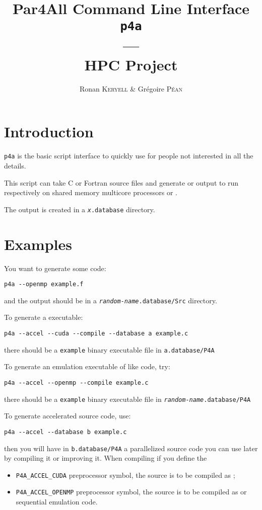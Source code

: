 \documentclass[a4paper]{article}
\begin{document}
\title{Par4All Command Line Interface\\
  \texttt{p4a}\\
  ---\\
  HPC Project}

\author{Ronan \textsc{Keryell} \& Grégoire \textsc{Péan}}

\maketitle

\tableofcontents{}

\section{Introduction}
\label{sec:introduction}

\texttt{p4a} is the basic script interface to quickly use \Apfa for people
not interested in all the \Apfa details.

This script can take C or Fortran source files and generate \Aopenmp or
\Acuda output to run respectively on shared memory multicore processors or
\Agpu.

The output is created in a \texttt{\emph{x}.database} directory.


\section{Examples}
\label{sec:examples}

You want to generate some \Aopenmp code:
\begin{verbatim}
p4a --openmp example.f
\end{verbatim}
and the output should be in a \texttt{\emph{random-name}.database/Src}
directory.

To generate a \Acuda executable:
\begin{verbatim}
p4a --accel --cuda --compile --database a example.c
\end{verbatim}
there should be a \texttt{example} binary executable file in
\texttt{a.database/P4A}

To generate an \Aopenmp emulation executable of \Agpu like code, try:
\begin{verbatim}
p4a --accel --openmp --compile example.c
\end{verbatim}
there should be a \texttt{example} binary executable file in
\texttt{\emph{random-name}.database/P4A}

To generate accelerated source code, use:
\begin{verbatim}
p4a --accel --database b example.c
\end{verbatim}
then you will have in \texttt{b.database/P4A} a parallelized source code
you can use later by compiling it or improving it. When compiling if you
define the
\begin{itemize}
\item \verb|P4A_ACCEL_CUDA| preprocessor symbol, the source is to be
  compiled as \Acuda;
\item \verb|P4A_ACCEL_OPENMP| preprocessor symbol, the source is to be
  compiled as \Aopenmp or sequential emulation code.
\end{itemize}
\end{document}
